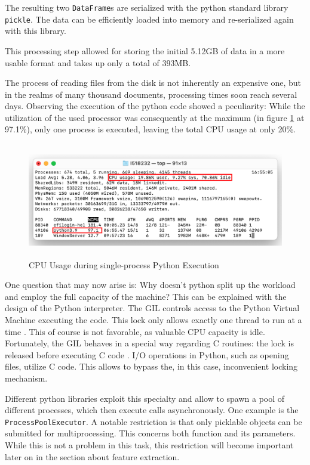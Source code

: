	The resulting two \lstinline|DataFrame|s are serialized with the python standard library \lstinline|pickle|. The data can be efficiently loaded into memory and re-serialized again with this library.
	
	This processing step allowed for storing the initial 5.12GB of data in a more usable format and takes up only a total of 393MB.

	The process of reading files from the disk is not inherently an expensive one, but in the realms of many thousand documents, processing times soon reach several days. Observing the execution of the python code showed a peculiarity: While the utilization of the used processor was consequently at the maximum (in figure \ref{fig:cpu} at 97.1\%), only one process is executed, leaving the total CPU usage at only 20\%. 
	
	\begin{figure}[ht]
		\centering
		\includegraphics[height=5cm]{Bilder/practical/python_processes.png}
		\caption{CPU Usage during single-process Python Execution}
		\label{fig:cpu}
	\end{figure}
	
	
	One question that may now arise is: Why doesn't python split up the workload and employ the full capacity of the machine?
	This can be explained with the design of the Python interpreter. The \ac{GIL} controls access to the Python Virtual Machine executing the code. This lock only allows exactly one thread to run at a time \cite{corePython}. This of course is not favorable, as valuable CPU capacity is idle. Fortunately, the \ac{GIL} behaves in a special way regarding C routines: the lock is released before executing C code \cite{corePython}. I/O operations in Python, such as opening files, utilize C code. This allows to bypass the, in this case, inconvenient locking mechanism. 
	
	Different python libraries exploit this specialty and allow to spawn a pool of different processes, which then execute calls asynchronously. One example is the \lstinline|ProcessPoolExecutor|. A notable restriction is that only picklable objects can be submitted for multiprocessing. This concerns both function and its parameters. While this is not a problem in this task, this restriction will become important later on in the section about feature extraction.
	
